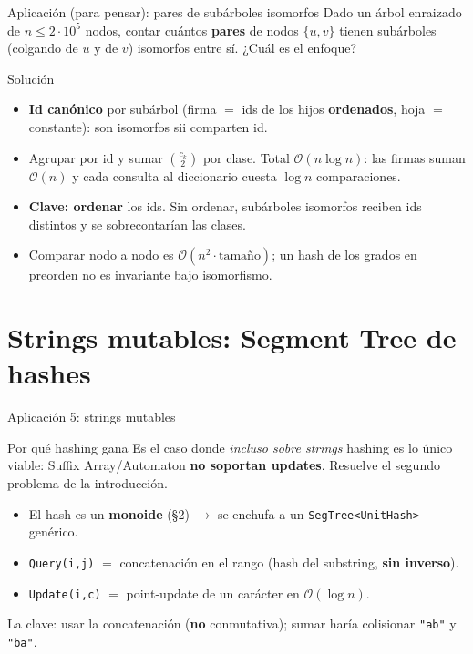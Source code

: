 \documentclass{beamer}
\begin{document}
\begin{frame}{Aplicación (para pensar): pares de subárboles isomorfos}
Dado un árbol enraizado de $n \le 2\cdot 10^5$ nodos, contar cuántos \textbf{pares} de nodos $\{u, v\}$ tienen subárboles (colgando de $u$ y de $v$) isomorfos entre sí. ¿Cuál es el enfoque?
\pause
\begin{block}{Solución}
\footnotesize
\begin{itemize}
    \item \textbf{Id canónico} por subárbol (firma $=$ ids de los hijos \textbf{ordenados}, hoja $=$ constante): son isomorfos sii comparten id.
    \item Agrupar por id y sumar $\binom{c_k}{2}$ por clase. Total $\mathcal{O}(n\log n)$: las firmas suman $\mathcal{O}(n)$ y cada consulta al diccionario cuesta $\log n$ comparaciones.
    \item \textbf{Clave: ordenar} los ids. Sin ordenar, subárboles isomorfos reciben ids distintos y se sobrecontarían las clases.
    \item Comparar nodo a nodo es $\mathcal{O}(n^2\cdot\text{tamaño})$; un hash de los grados en preorden no es invariante bajo isomorfismo.
\end{itemize}
\end{block}
\end{frame}

\section{Strings mutables: Segment Tree de hashes}

\begin{frame}{Aplicación 5: strings mutables}
\begin{block}{Por qué hashing gana}
Es el caso donde \emph{incluso sobre strings} hashing es lo único viable: Suffix Array/Automaton \textbf{no soportan updates}. Resuelve el segundo problema de la introducción.
\end{block}
\begin{itemize}
    \item El hash es un \textbf{monoide} (\S2) $\to$ se enchufa a un \texttt{SegTree<UnitHash>} genérico.
    \item \texttt{Query(i,j)} $=$ concatenación en el rango (hash del substring, \textbf{sin inverso}).
    \item \texttt{Update(i,c)} $=$ point-update de un carácter en $\mathcal{O}(\log n)$.
\end{itemize}
La clave: usar la concatenación (\textbf{no} conmutativa); sumar haría colisionar \texttt{"ab"} y \texttt{"ba"}.
\end{frame}
\end{document}
